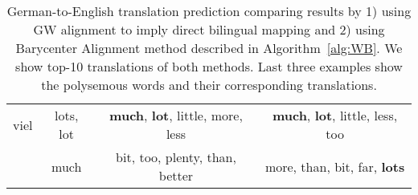 \documentclass{article}
\begin{document}
\begin{table*}[ht]
{\begin{tabular}{c|c|c|c}
         viel & lots, lot & \textbf{much}, \textbf{lot}, little, more, less  & \textbf{much}, \textbf{lot}, little, less, too \\
          & much &  bit, too, plenty, than, better  &  more, than, bit, far, \textbf{lots}\\
         \hline
        
\hline
\end{tabular}
}
\caption{German-to-English translation prediction comparing results by 1) using GW alignment to imply direct bilingual mapping and 2) using Barycenter Alignment method described in Algorithm~\ref{alg:WB}. We show top-10 translations of both methods. Last three examples show the polysemous words and their corresponding translations. 
\label{table:translation-prediction}}
\end{table*}
\end{document}
